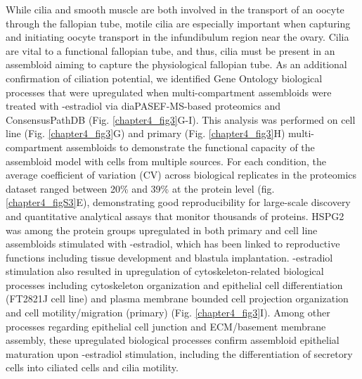 \begin{refsection}
    While cilia and smooth muscle are both involved in the transport of an oocyte through the fallopian tube, motile cilia are especially important when capturing and initiating oocyte transport in the infundibulum region near the ovary\cite{yuan2021a,suarez2021a,wanggren2008a}. Cilia are vital to a functional fallopian tube, and thus, cilia must be present in an assembloid aiming to capture the physiological fallopian tube. As an additional confirmation of ciliation potential, we identified Gene Ontology\cite{ashburner2000a,Ashburner2000Gene} biological processes that were upregulated when multi-compartment assembloids were treated with \textbeta-estradiol via diaPASEF-MS-based proteomics\cite{meier2020a} and ConsensusPathDB\cite{kamburov2011a,kamburov2011a} (Fig. \ref{chapter4_fig3}G-I). This analysis was performed on cell line (Fig. \ref{chapter4_fig3}G) and primary (Fig. \ref{chapter4_fig3}H) multi-compartment assembloids to demonstrate the functional capacity of the assembloid model with cells from multiple sources. For each condition, the average coefficient of variation (CV) across biological replicates in the proteomics dataset ranged between 20\% and 39\% at the protein level (fig. \ref{chapter4_figS3}E), demonstrating good reproducibility for large-scale discovery and quantitative analytical assays that monitor thousands of proteins. HSPG2 was among the protein groups upregulated in both primary and cell line assembloids stimulated with \textbeta-estradiol, which has been linked to reproductive functions including tissue development and blastula implantation\cite{chen2023a,garcia2024a}.  \textbeta-estradiol stimulation also resulted in upregulation of cytoskeleton-related biological processes including cytoskeleton organization and epithelial cell differentiation (FT2821J cell line) and plasma membrane bounded cell projection organization and cell motility/migration (primary) (Fig. \ref{chapter4_fig3}I). Among other processes regarding epithelial cell junction and ECM/basement membrane assembly, these upregulated biological processes confirm assembloid epithelial maturation upon \textbeta-estradiol stimulation, including the differentiation of secretory cells into ciliated cells and cilia motility\cite{park2008a,antoniades2014a,garcia2018a}.


\end{refsection}
